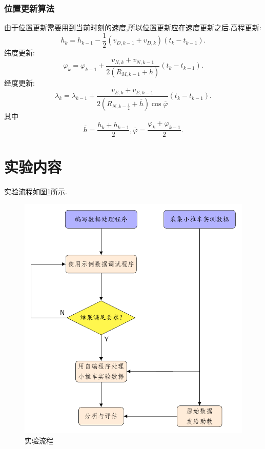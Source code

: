 \documentclass[10pt,a4paper]{ctexart}
\begin{document}
\subsubsection*{位置更新算法}
由于位置更新需要用到当前时刻的速度,所以位置更新应在速度更新之后.高程更新:
\[
    h_k = h_{k - 1} - \frac{1}{2}(v_{D,k - 1} + v_{D,k})(t_k - t_{k - 1}).
\]
纬度更新:
\[
    \varphi_k =\varphi_{k - 1} + \frac{v_{N,k} + v_{N,k - 1}}{2(R_{M,k - 1} +\overline{h})}(t_k - t_{k - 1}). 
\]
经度更新:
\[
    \lambda_k =\lambda_{k - 1} + \frac{v_{E,k} + v_{E,k - 1}}{2(R_{N,k - \frac{1}{2}} +\overline{h})\cos \overline{\varphi}}(t_k - t_{k - 1}). 
\]
其中
\[
    \overline{h} = \frac{h_k + h_{k - 1}}{2},\overline{\varphi} = \frac{\varphi_k +\varphi_{k - 1}}{2} .
\]

\section{实验内容}

实验流程如图\ref{fig:Flowchart}所示.
\begin{figure}[htbp]
\centering
\includegraphics[scale=0.95]{Figures/Flowchart.pdf}
\caption{实验流程}
\label{fig:Flowchart}
\end{figure}
\end{document}

